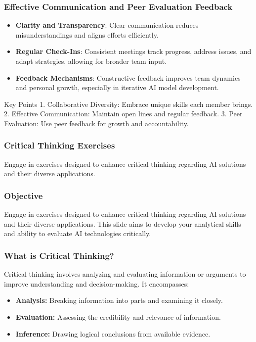 \documentclass[aspectratio=169]{beamer}
\begin{document}
\begin{frame}[fragile]
    \frametitle{Effective Communication and Peer Evaluation Feedback}
    \begin{itemize}
        \item \textbf{Clarity and Transparency}: Clear communication reduces misunderstandings and aligns efforts efficiently.
        \item \textbf{Regular Check-Ins}: Consistent meetings track progress, address issues, and adapt strategies, allowing for broader team input.
        \item \textbf{Feedback Mechanisms}: Constructive feedback improves team dynamics and personal growth, especially in iterative AI model development.
    \end{itemize}
    \begin{block}{Key Points}
        1. Collaborative Diversity: Embrace unique skills each member brings.
        2. Effective Communication: Maintain open lines and regular feedback.
        3. Peer Evaluation: Use peer feedback for growth and accountability.
    \end{block}
\end{frame}

\begin{frame}[fragile]
    \frametitle{Critical Thinking Exercises}
    Engage in exercises designed to enhance critical thinking regarding AI solutions and their diverse applications.
\end{frame}

\begin{frame}[fragile]
    \frametitle{Objective}
    \begin{block}{}
        Engage in exercises designed to enhance critical thinking regarding AI solutions and their diverse applications. This slide aims to develop your analytical skills and ability to evaluate AI technologies critically.
    \end{block}
\end{frame}

\begin{frame}[fragile]
    \frametitle{What is Critical Thinking?}
    Critical thinking involves analyzing and evaluating information or arguments to improve understanding and decision-making. It encompasses:
    \begin{itemize}
        \item \textbf{Analysis:} Breaking information into parts and examining it closely.
        \item \textbf{Evaluation:} Assessing the credibility and relevance of information.
        \item \textbf{Inference:} Drawing logical conclusions from available evidence.
    \end{itemize}
\end{frame}
\end{document}
